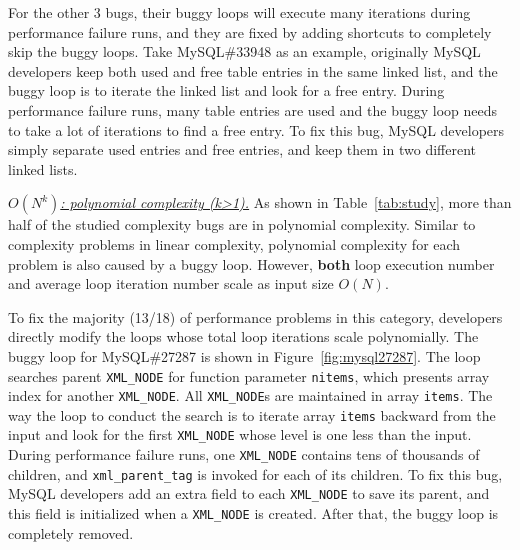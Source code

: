 For the other 3 bugs, their buggy loops will execute many iterations 
during performance failure runs,
and they are fixed by adding shortcuts to completely skip the buggy loops.
Take MySQL\#33948 as an example, 
originally MySQL developers keep both used and free table entries in the same linked list,
and the buggy loop is to iterate the linked list and look for a free entry.
During performance failure runs, many table entries are used and the buggy loop 
needs to take a lot of iterations to find a free entry. 
To fix this bug, MySQL developers simply separate used entries 
and free entries, and keep them in two different linked lists. 


{\underline{\textit{$O(N^k)$: polynomial complexity (k>1).}}}
As shown in Table~\ref{tab:study}, 
more than half of the studied complexity bugs are in polynomial complexity. 
Similar to complexity problems in linear complexity,
polynomial complexity for each problem is also caused by a buggy loop.
However, {\bf both} loop execution number and average loop iteration number
scale as input size $O(N)$.

To fix the majority (13/18) of performance problems in this category, 
developers directly modify the loops whose total loop iterations scale polynomially.  
The buggy loop for MySQL\#27287 is shown in Figure~\ref{fig:mysql27287}.
The loop searches parent \texttt{XML\_NODE} for function parameter \texttt{nitems}, 
which presents array index for another \texttt{XML\_NODE}.
All \texttt{XML\_NODE}s are maintained in array \texttt{items}. 
The way the loop to conduct the search is to iterate array \texttt{items} 
backward from the input and look for the first \texttt{XML\_NODE} 
whose level is one less than the input.
During performance failure runs, 
one \texttt{XML\_NODE} contains tens of thousands of children, 
and \texttt{xml\_parent\_tag} is invoked for each of its children. 
To fix this bug, MySQL developers add an extra field to each 
\texttt{XML\_NODE} to save its parent, 
and this field is initialized when a \texttt{XML\_NODE} is created. 
After that, the buggy loop is completely removed. 


